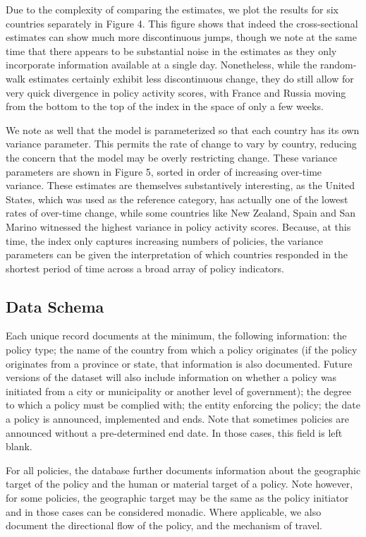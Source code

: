 \documentclass[]{article}
\begin{document}
Due to the complexity of comparing the estimates, we plot the results for six countries separately in Figure 4. This figure shows that indeed the cross-sectional estimates can show much more discontinuous jumps, though we note at the same time that there appears to be substantial noise in the estimates as they only incorporate information available at a single day. Nonetheless, while the random-walk estimates certainly exhibit less discontinuous change, they do still allow for very quick divergence in policy activity scores, with France and Russia moving from the bottom to the top of the index in the space of only a few weeks.

We note as well that the model is parameterized so that each country has its own variance parameter. This permits the rate of change to vary by country, reducing the concern that the model may be overly restricting change. These variance parameters are shown in Figure 5, sorted in order of increasing over-time variance. These estimates are themselves substantively interesting, as the United States, which was used as the reference category, has actually one of the lowest rates of over-time change, while some countries like New Zealand, Spain and San Marino witnessed the highest variance in policy activity scores. Because, at this time, the index only captures increasing numbers of policies, the variance parameters can be given the interpretation of which countries responded in the shortest period of time across a broad array of policy indicators.

\hypertarget{data-schema}{%
\subsection*{Data Schema}\label{data-schema}}

Each unique record documents at the minimum, the following information: the policy type; the name of the country from which a policy originates (if the policy originates from a province or state, that information is also documented. Future versions of the dataset will also include information on whether a policy was initiated from a city or municipality or another level of government); the degree to which a policy must be complied with; the entity enforcing the policy; the date a policy is announced, implemented and ends. Note that sometimes policies are announced without a pre-determined end date. In those cases, this field is left blank.

For all policies, the database further documents information about the geographic target of the policy and the human or material target of a policy. Note however, for some policies, the geographic target may be the same as the policy initiator and in those cases can be considered monadic. Where applicable, we also document the directional flow of the policy, and the mechanism of travel.
\end{document}
